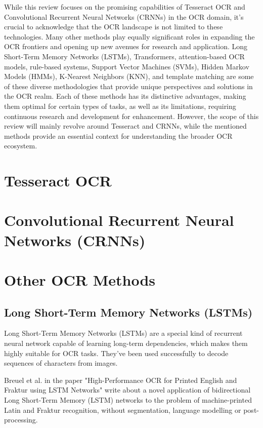 While this review focuses on the promising capabilities of Tesseract OCR and Convolutional Recurrent Neural Networks (CRNNs) in the OCR domain, it's crucial to acknowledge that the OCR landscape is not limited to these technologies. Many other methods play equally significant roles in expanding the OCR frontiers and opening up new avenues for research and application. Long Short-Term Memory Networks (LSTMs), Transformers, attention-based OCR models, rule-based systems, Support Vector Machines (SVMs), Hidden Markov Models (HMMs), K-Nearest Neighbors (KNN), and template matching are some of these diverse methodologies that provide unique perspectives and solutions in the OCR realm. Each of these methods has its distinctive advantages, making them optimal for certain types of tasks, as well as its limitations, requiring continuous research and development for enhancement. However, the scope of this review will mainly revolve around Tesseract and CRNNs, while the mentioned methods provide an essential context for understanding the broader OCR ecosystem.


\section{Tesseract OCR}

\section{Convolutional Recurrent Neural Networks (CRNNs)}
\newpage

\section{Other OCR Methods}

\subsection{Long Short-Term Memory Networks (LSTMs)}

Long Short-Term Memory Networks (LSTMs) are a special kind of recurrent neural network capable of learning long-term dependencies, which makes them highly suitable for OCR tasks. They've been used successfully to decode sequences of characters from images.\cite{breuelHighPerformanceOCRPrinted2013}

Breuel et al. in the paper "High-Performance OCR for Printed English and Fraktur using LSTM Networks" write about a novel application of bidirectional Long Short-Term Memory (LSTM) networks to the problem of machine-printed Latin and Fraktur recognition, without segmentation, language modelling or post-processing.

